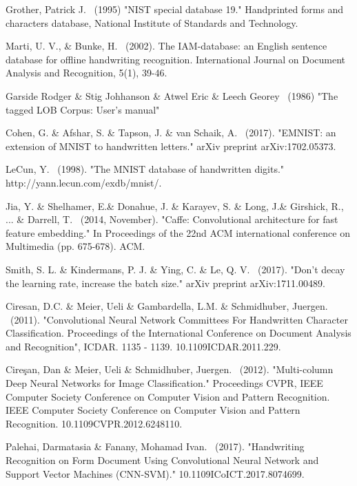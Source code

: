 \documentclass{article}
\begin{document}
\begin{thebibliography}{99}
   Grother, Patrick J. \ (1995) "NIST special database 19." Handprinted forms and characters database, National Institute of Standards and Technology.

   Marti, U. V., \& Bunke, H. \ (2002). The IAM-database: an English sentence database for offline handwriting recognition. International Journal on Document Analysis and Recognition, 5(1), 39-46.

   Garside Rodger \& Stig Johhanson \& Atwel Eric \& Leech Georey \ (1986) "The tagged LOB Corpus: User's manual"

   Cohen, G. \& Afshar, S. \& Tapson, J. \& van Schaik, A. \ (2017). "EMNIST: an extension of MNIST to handwritten letters." arXiv preprint arXiv:1702.05373.

   LeCun, Y. \ (1998). "The MNIST database of handwritten digits." http://yann.lecun.com/exdb/mnist/.

   Jia, Y. \& Shelhamer, E.\& Donahue, J. \& Karayev, S. \& Long, J.\& Girshick, R., ... \& Darrell, T. \ (2014, November). "Caffe: Convolutional architecture for fast feature embedding." In Proceedings of the 22nd ACM international conference on Multimedia (pp. 675-678). ACM.

   Smith, S. L. \& Kindermans, P. J. \& Ying, C. \& Le, Q. V. \ (2017). "Don't decay the learning rate, increase the batch size." arXiv preprint arXiv:1711.00489.

   Ciresan, D.C. \& Meier, Ueli \& Gambardella, L.M. \& Schmidhuber, Juergen. \ (2011). "Convolutional Neural Network Committees For Handwritten Character Classification. Proceedings of the International Conference on Document Analysis and Recognition", ICDAR. 1135 - 1139. 10.1109\/ICDAR.2011.229. 

   Cireşan, Dan \& Meier, Ueli \& Schmidhuber, Juergen. \ (2012). "Multi-column Deep Neural Networks for Image Classification." Proceedings  CVPR, IEEE Computer Society Conference on Computer Vision and Pattern Recognition. IEEE Computer Society Conference on Computer Vision and Pattern Recognition. 10.1109\/CVPR.2012.6248110. 

   Palehai, Darmatasia \& Fanany, Mohamad Ivan. \ (2017). "Handwriting Recognition on Form Document Using Convolutional Neural Network and Support Vector Machines (CNN-SVM)." 10.1109\/ICoICT.2017.8074699. 


\end{thebibliography}
\end{document}

